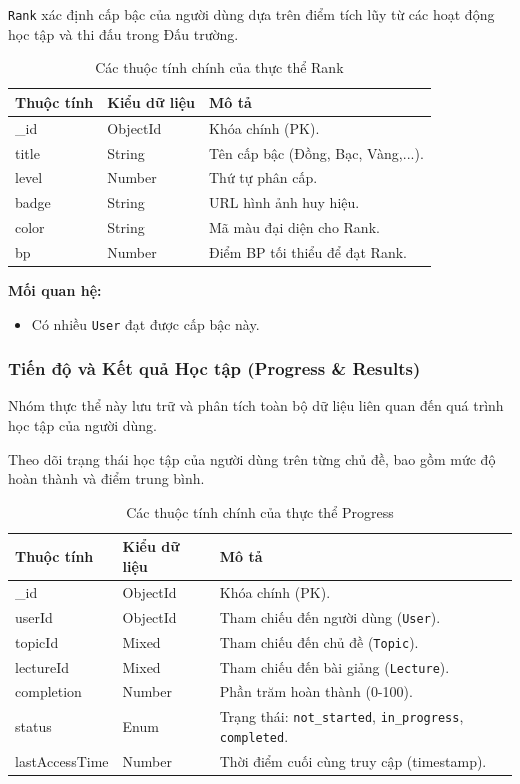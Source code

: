 \texttt{Rank} xác định cấp bậc của người dùng dựa trên điểm tích lũy từ các hoạt động học tập và thi đấu trong Đấu trường.
\begin{table}[H]
	\centering
	\begin{tabularx}{\textwidth}{|l|l|X|}
		\hline
		\textbf{Thuộc tính} & \textbf{Kiểu dữ liệu} & \textbf{Mô tả} \\ \hline
		\_id & ObjectId & Khóa chính (PK). \\ \hline
		title & String & Tên cấp bậc (Đồng, Bạc, Vàng,...). \\ \hline
		level & Number & Thứ tự phân cấp. \\ \hline
		badge & String & URL hình ảnh huy hiệu. \\ \hline
		color & String & Mã màu đại diện cho Rank. \\ \hline
		bp & Number & Điểm BP tối thiểu để đạt Rank. \\ \hline
	\end{tabularx}
	\caption{Các thuộc tính chính của thực thể Rank}
\end{table}
\newline
\textbf{Mối quan hệ:}
\begin{itemize}
	\item Có nhiều \texttt{User} đạt được cấp bậc này.
\end{itemize}

\subsubsection{Tiến độ và Kết quả Học tập (Progress \& Results)}

Nhóm thực thể này lưu trữ và phân tích toàn bộ dữ liệu liên quan đến quá trình học tập của người dùng.

Theo dõi trạng thái học tập của người dùng trên từng chủ đề, bao gồm mức độ hoàn thành và điểm trung bình.
\begin{table}[H]
	\centering
	\begin{tabularx}{\textwidth}{|l|l|X|}
		\hline
		\textbf{Thuộc tính} & \textbf{Kiểu dữ liệu} & \textbf{Mô tả} \\ \hline
		\_id & ObjectId & Khóa chính (PK). \\ \hline
		userId & ObjectId & Tham chiếu đến người dùng (\texttt{User}). \\ \hline
		topicId & Mixed & Tham chiếu đến chủ đề (\texttt{Topic}). \\ \hline
		lectureId & Mixed & Tham chiếu đến bài giảng (\texttt{Lecture}). \\ \hline
		completion & Number & Phần trăm hoàn thành (0-100). \\ \hline
		status & Enum & Trạng thái: \texttt{not\_started}, \texttt{in\_progress}, \texttt{completed}. \\ \hline
		lastAccessTime & Number & Thời điểm cuối cùng truy cập (timestamp). \\ \hline
	\end{tabularx}
	\caption{Các thuộc tính chính của thực thể Progress}
\end{table}

